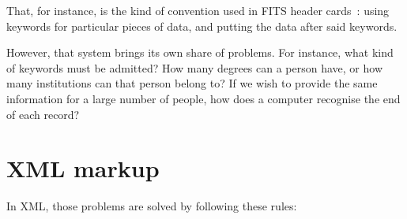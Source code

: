 		That, for instance, is the kind of convention used in FITS
		header cards~\cite{1981A&AS...44..363W}: using keywords for
		particular pieces of data, and putting the data after said
		keywords.
		
		However, that system brings its own share of problems. For
		instance, what kind of keywords must be admitted? How many
		degrees can a person have, or how many institutions can
		that person belong to? If we wish to provide the same
		information for a large number of people, how does a
		computer recognise the end of each record?
		
	
	\section{XML markup} %
	\label{sec:xml_markup}
		
		In XML, those problems are solved by following these rules:

